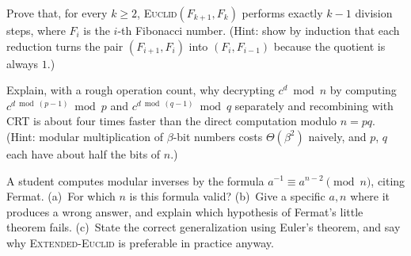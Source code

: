 \begin{exercise}
\label{ch30:ex-fib}
Prove that, for every $k \ge 2$, \textsc{Euclid}$(F_{k+1}, F_k)$ performs exactly $k-1$ division steps,
where $F_i$ is the $i$-th Fibonacci number. (Hint: show by induction that each
reduction turns the pair $(F_{i+1}, F_i)$ into $(F_i, F_{i-1})$ because the
quotient is always $1$.)
\end{exercise}

\begin{exercise}
\label{ch30:ex-crtrsa}
Explain, with a rough operation count, why decrypting $c^{d} \bmod n$ by
computing $c^{d \bmod (p-1)} \bmod p$ and $c^{d \bmod (q-1)} \bmod q$ separately
and recombining with CRT is about four times faster than the direct computation
modulo $n = pq$. (Hint: modular multiplication of $\beta$-bit numbers costs
$\Theta(\beta^2)$ naively, and $p$, $q$ each have about half the bits of $n$.)
\end{exercise}

\begin{exercise}
\label{ch30:ex-bug}
A student computes modular inverses by the formula $a^{-1} \equiv a^{n-2} \pmod
n$, citing Fermat. (a)~For which $n$ is this formula valid? (b)~Give a specific
$a, n$ where it produces a wrong answer, and explain which hypothesis of Fermat's
little theorem fails. (c)~State the correct generalization using Euler's theorem,
and say why \textsc{Extended-Euclid} is preferable in practice anyway.
\end{exercise}

